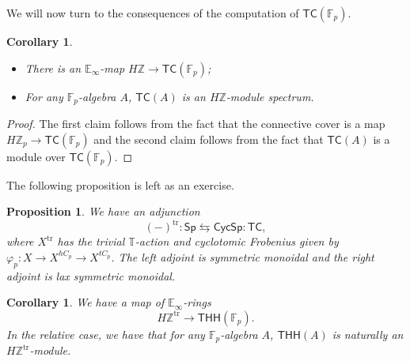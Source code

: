 \documentclass[10pt, oneside]{memoir}
\newtheorem{cor}[thm]{Corollary}
\newtheorem{prop}[thm]{Proposition}
\theoremstyle{definition}
\theoremstyle{remark}
\theoremstyle{plain}
\theoremstyle{definition}
\theoremstyle{remark}
\newcommand{\Z}{\mathbb{Z}}
\newcommand{\E}{\mathbb{E}}
\newcommand{\F}{\mathbb{F}}
\newcommand{\T}{\mathbb{T}}
\newcommand{\mr}[1]{\mathrm{#1}}
\newcommand{\ms}[1]{\mathsf{#1}}
\newcommand{\1}{\mathbf{1}}
\newcommand{\2}{\mathbf{2}}
\newcommand{\3}{\mathbf{3}}
\newcommand{\THH}{\ms{THH}}
\newcommand{\TC}{\ms{TC}}
\begin{document}
We will now turn to the consequences of the computation of \(\TC(\F_p) \).

\begin{cor}\leavevmode
    \begin{itemize}
        \item There is an \(\E_{\infty} \)-map \(H\Z \to \TC(\F_p) \);
        \item For any \(\F_p \)-algebra \(A \), \(\TC(A) \) is an \(H\Z \)-module spectrum.
    \end{itemize}
\end{cor}

\begin{proof}
    The first claim follows from the fact that the connective cover is a map \(H\Z_p \to \TC(\F_p) \) and the second claim follows from the fact that \(\TC(A) \) is a module over \(\TC(\F_p) \).
\end{proof}

The following proposition is left as an exercise.
\begin{prop}
    We have an adjunction
    \[ (-)^{\mr{tr}} \colon \ms{Sp} \leftrightarrows \ms{CycSp} \colon \TC, \]
    where \(X^{\mr{tr}} \) has the trivial \(\T \)-action and cyclotomic Frobenius given by \(\varphi_p \colon X \to X^{hC_p} \to X^{t C_p} \). The left adjoint is symmetric monoidal and the right adjoint is lax symmetric monoidal.
\end{prop}

\begin{cor}
    We have a map of \(\E_{\infty} \)-rings
    \[ H\Z^{\mr{tr}} \to \THH(\F_p). \]
    In the relative case, we have that for any \(\F_p \)-algebra \(A \), \(\THH(A) \) is naturally an \(H\Z^{\mr{tr}} \)-module.
\end{cor}
\end{document}
